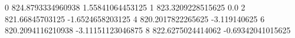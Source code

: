 0 824.8793334960938 1.55841064453125
1 823.3209228515625 0.0
2 821.66845703125 -1.6524658203125
4 820.2017822265625 -3.119140625
6 820.2094116210938 -3.11151123046875
8 822.6275024414062 -0.69342041015625
